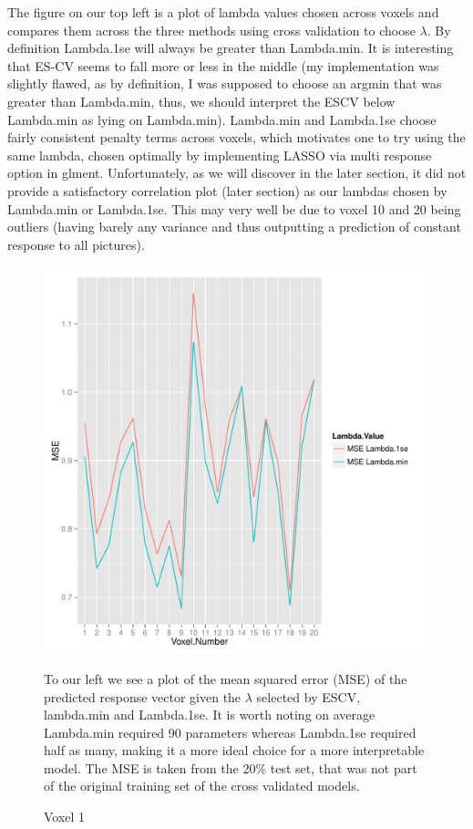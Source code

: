 \documentclass[english]{amsart}
\begin{document}
The figure on our top left is a plot of lambda values chosen across voxels and compares them across the three methods using cross validation to choose $\lambda$.  By definition Lambda.1se will always be greater than Lambda.min.  It is interesting that ES-CV seems to fall more or less in the middle (my implementation was slightly flawed, as by definition, I was supposed to choose an argmin that was greater than Lambda.min, thus, we should interpret the ESCV below Lambda.min as lying on Lambda.min).  Lambda.min and Lambda.1se choose fairly consistent penalty terms across voxels, which motivates one to try using the same lambda, chosen optimally by implementing LASSO via multi response option in glment.  Unfortunately, as we will discover in the later section, it did not provide a satisfactory correlation plot (later section) as our lambdas chosen by Lambda.min or Lambda.1se.  This may very well be due to voxel 10 and 20 being outliers (having barely any variance and thus outputting a prediction of constant response to all pictures).  

\begin{figure}[H]
  \includegraphics[width=\linewidth, height=250pts]{MSE_lambda_plot.pdf}
  \caption{Voxel 1}
\endminipage\hfill
{}
To our left we see a plot of the mean squared error (MSE) of the predicted response vector given the $\lambda$ selected by ESCV, lambda.min and Lambda.1se.  It is worth noting on average Lambda.min required 90 parameters whereas Lambda.1se required half as many, making it a more ideal choice for a more interpretable model.  The MSE is taken from the 20\% test set, that was not part of the original training set of the cross validated models.  

\endminipage
\end{figure}
\end{document}
